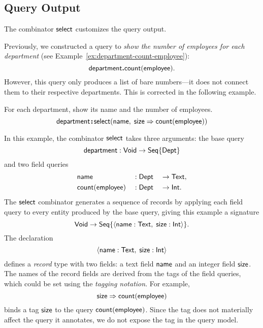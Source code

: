 \subsection*{Query Output}

The combinator $\mathsf{select}$ customizes the query output.

Previously, we constructed a query to \emph{show the number of employees for
each department} (see Example~\ref{ex:department-count-employee}):
\begin{equation*}
    \mathsf{department}\boldsymbol{.}\mathsf{count}(\mathsf{employee}).
\end{equation*}
However, this query only produces a list of bare numbers---it does not connect
them to their respective departments.  This is corrected in the following example.

\begin{demo}
    \label{ex:department-select-name-size}
    For each department, show its name and the number of employees.
    \begin{equation*}
        \mathsf{department}
        \!\boldsymbol{:}\!\mathsf{select}(\mathsf{name},\;\mathsf{size}\Rightarrow\mathsf{count}(\mathsf{employee}))
    \end{equation*}
\end{demo}

In this example, the combinator $\mathsf{select}$ takes three arguments: the base query
\begin{equation*}
    \mathsf{department} : \mathsf{Void} \to \mathsf{Seq}{\left\{\mathsf{Dept}\right\}}
\end{equation*}
and two field queries
\begin{alignat*}{3}
    & \mathsf{name} && : \mathsf{Dept} && \to \mathsf{Text}, \\
    & \mathsf{count}(\mathsf{employee}) && : \mathsf{Dept} && \to \mathsf{Int}.
\end{alignat*}
The $\mathsf{select}$ combinator generates a sequence of records by applying each field
query to every entity produced by the base query, giving this example a
signature
\begin{equation*}
    \mathsf{Void} \to \mathsf{Seq}{\left\{\langle \mathsf{name}:\mathsf{Text},\; \mathsf{size}:\mathsf{Int} \rangle\right\}}.
\end{equation*}
The declaration
\begin{equation*}
    \langle \mathsf{name}:\mathsf{Text},\; \mathsf{size}:\mathsf{Int} \rangle
\end{equation*}
defines a \emph{record} type with two fields: a text field $\mathsf{name}$ and an
integer field $\mathsf{size}$.  The names of the record fields are derived from the
tags of the field queries, which could be set using the \emph{tagging
notation}.  For example,
\begin{equation*}
    \mathsf{size} \Rightarrow \mathsf{count}(\mathsf{employee})
\end{equation*}
binds a tag $\mathsf{size}$ to the query $\mathsf{count}(\mathsf{employee})$.  Since the tag does not
materially affect the query it annotates, we do not expose the tag in the query
model.

